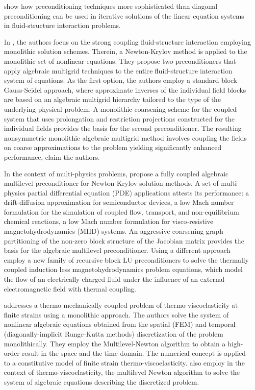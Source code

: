 \cite{tezduyar2006space} show how preconditioning techniques more sophisticated than diagonal preconditioning can be used in iterative solutions of the linear equation systems in fluid-structure interaction problems.

In \cite{gee_truly_2011}, the authors focus on the strong coupling fluid-structure interaction employing monolithic solution schemes.
Therein, a Newton-Krylov method is applied to the monolithic set of nonlinear equations.
They propose two preconditioners that apply algebraic multigrid techniques to the entire fluid-structure interaction system of equations.
As the first option, the authors employ a standard block Gauss-Seidel approach, where approximate inverses of the individual field blocks are based on an algebraic multigrid hierarchy tailored to the type of the underlying physical problem.
A monolithic coarsening scheme for the coupled system that uses prolongation and restriction projections constructed for the individual fields provides the basis for the second preconditioner.
The resulting nonsymmetric monolithic algebraic multigrid method involves coupling the fields on coarse approximations to the problem yielding significantly enhanced performance, claim the authors.

In the context of multi-physics problems, \cite{https://doi.org/10.1002/fld.2402} propose a fully coupled algebraic multilevel preconditioner for Newton-Krylov solution methods.
A set of multi-physics partial differential equation (PDE) applications attests its performance: a drift-diffusion approximation for semiconductor devices,
a low Mach number formulation for the simulation of coupled flow, transport, and non-equilibrium chemical reactions,
a low Mach number formulation for visco-resistive magnetohydrodynamics (MHD) systems.
An aggressive-coarsening graph-partitioning of the non-zero block structure of the Jacobian matrix provides the basis for the algebraic multilevel preconditioner.
Using a different approach \cite{badia_block_2014} employ a new family of recursive block LU preconditioners to solve the thermally coupled induction less magnetohydrodynamics problem equations, which model the flow of an electrically charged fluid under the influence of an external electromagnetic field with thermal coupling.

\cite{netz_high-order_2013} addresses a thermo-mechanically coupled problem of thermo-viscoelasticity at finite strains using a monolithic approach.
The authors solve the system of nonlinear algebraic equations obtained from the spatial (FEM) and temporal (diagonally-implicit Runge-Kutta methods) discretization of the problem monolithically.
They employ the Multilevel-Newton algorithm to obtain a high-order result in the space and the time domain.
The numerical concept is applied to a constitutive model of finite strain thermo-viscoelasticity.
\cite{rothe_monolithic_2015} also employ in the context of thermo-viscoelasticity, the multilevel Newton algorithm to solve the system of algebraic equations describing the discretized problem.


